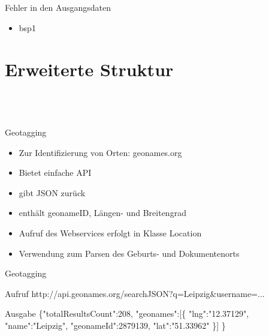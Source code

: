 \documentclass[12pt]{beamer}
\begin{document}
\begin{large}
 \subsection*{~}
\begin{frame}{Fehler in den Ausgangsdaten}
 \begin{itemize}
  \item bsp1
 \end{itemize}
\end{frame}

\section{Erweiterte Struktur}
 \subsection*{~}

\begin{frame}{Geotagging}
\begin{itemize}
  \item Zur Identifizierung von Orten: geonames.org
  \item Bietet einfache API
  \item gibt JSON zurück
  \item enthält geonameID, Längen- und Breitengrad
  \item Aufruf des Webservices erfolgt in Klasse Location
  \item Verwendung zum Parsen des Geburts- und Dokumentenorts
 \end{itemize}
\end{frame}
 
\begin{frame}{Geotagging}
 \vspace*{\fill}
 \begin{block}{Aufruf}
 \normalsize http://api.geonames.org/searchJSON?q=Leipzig\&username=...
 \end{block}
 
 \begin{block}{Ausgabe}
 \normalsize \{"{}totalResultsCount"{}:208,
  \newline
  \hspace*{0.5cm}"{}geonames"{}:[\{
  \newline
  \hspace*{1cm}"{}lng"{}:"{}12.37129"{},
  \newline
  \hspace*{1cm}"{}name"{}:"{}Leipzig"{},
  \newline  
  \hspace*{1cm}"{}geonameId"{}:2879139,
  \newline
  \hspace*{1cm}"{}lat"{}:"{}51.33962"{}
  \newline
  \hspace*{0.5cm}\}]
  \newline
  \}
 \end{block}
\end{frame} 
 

\end{large}
\end{document}
